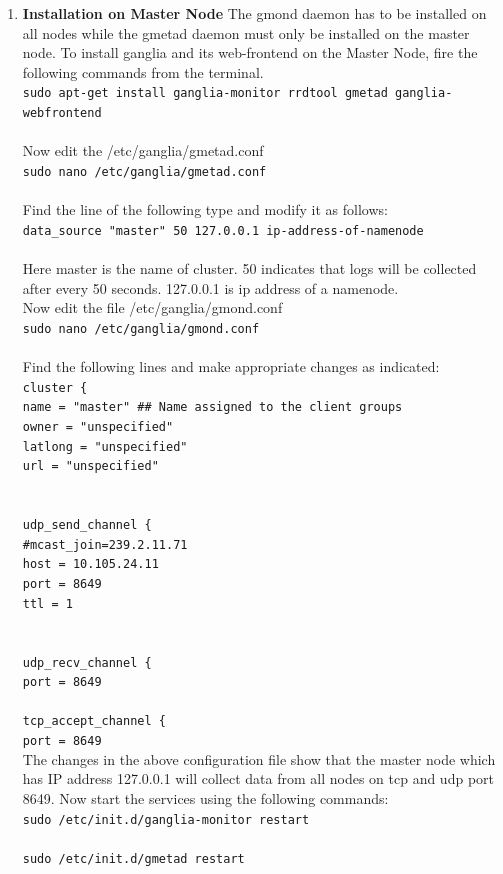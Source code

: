 \documentclass[12pt]{book}
\newcommand{\shellcmd}[1]{\\\indent\texttt{\footnotesize #1}\\}
\begin{document}
\begin{enumerate}
\item \textbf{Installation on Master Node}
The gmond daemon has to be installed on all nodes while the gmetad daemon must only
be installed on the master node. To install ganglia and its web-frontend on the Master
Node, fire the following commands from the terminal.\cite{ganglia}
\shellcmd{sudo apt-get install ganglia-monitor rrdtool gmetad ganglia-webfrontend}\\\noindent
Now edit the /etc/ganglia/gmetad.conf
\shellcmd{sudo nano /etc/ganglia/gmetad.conf}\\\noindent
Find the line of the following type and modify it as follows:
\shellcmd{data\_source "master" 50 127.0.0.1 ip-address-of-namenode}\\\noindent
Here master is the name of cluster. 50 indicates that logs will be collected after every 50 seconds. 127.0.0.1 is ip address of a namenode.\\
Now edit the file /etc/ganglia/gmond.conf
\shellcmd{sudo nano /etc/ganglia/gmond.conf}\\
Find the following lines and make appropriate changes as indicated:
\shellcmd{cluster \{ \\\indent 
name = "master" \#\# Name assigned to the client groups\\\indent 
owner = "unspecified"\\\indent 
latlong = "unspecified"\\\indent 
url = "unspecified"\\\indent}
\shellcmd{udp\_send\_channel \{ \\\indent 
\#mcast\_join=239.2.11.71\\\indent 
host = 10.105.24.11\\\indent 
port = 8649\\\indent 
ttl = 1\\\indent }
\shellcmd{udp\_recv\_channel \{ \\\indent 
port = 8649}
\shellcmd{tcp\_accept\_channel \{ \\\indent 
port = 8649}
The changes in the above configuration file show that the master node which has IP
address 127.0.0.1 will collect data from all nodes on tcp and udp port 8649.
Now start the services using the following commands:
\shellcmd{sudo /etc/init.d/ganglia-monitor restart}
\shellcmd{sudo /etc/init.d/gmetad restart}


\end{enumerate}
\end{document}
